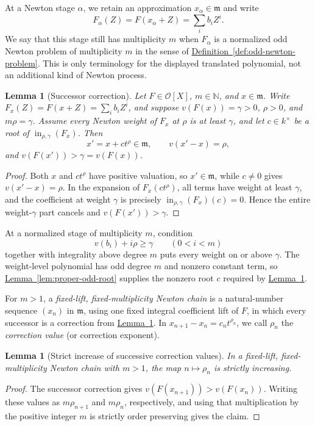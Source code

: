 \documentclass[11pt]{article}
\newcommand{\Val}{v}
\newcommand{\Init}{\operatorname{in}}
\newcommand{\Ocal}{\mathcal O}
\newcommand{\namedref}[2]{\hyperref[#2]{#1~\ref*{#2}}}
\theoremstyle{proofnote}
\newtheorem{lemma}[theorem]{Lemma}
\begin{document}
At a Newton stage \(\alpha\), we retain an approximation
\(x_\alpha\in\mathfrak m\) and write
\[
  F_\alpha(Z)=F(x_\alpha+Z)=\sum_i b_iZ^i.
\]
We say that this stage still has multiplicity \(m\) when \(F_\alpha\) is a
normalized odd Newton problem of multiplicity \(m\) in the sense of
\namedref{Definition}{def:odd-newton-problem}.  This is only terminology for
the displayed translated polynomial, not an additional kind of Newton
process.

\begin{lemma}[Successor correction]
\label{lem:successor-correction}
  Let \(F\in\Ocal[X]\), \(m\in\mathbb N\), and \(x\in\mathfrak m\).  Write
  \(F_x(Z)=F(x+Z)=\sum_i b_iZ^i\), and suppose
  \(\Val(F(x))=\gamma>0\), \(\rho>0\), and \(m\rho=\gamma\).  Assume every
  Newton weight of \(F_x\) at \(\rho\) is at least \(\gamma\), and let
  \(c\in k^\times\) be a root of \(\Init_{\rho,\gamma}(F_x)\).  Then
  \[
    x'=x+c t^\rho\in\mathfrak m,
    \qquad \Val(x'-x)=\rho,
  \]
  and \(\Val(F(x'))>\gamma=\Val(F(x))\).
\end{lemma}
\begin{proof}
  Both \(x\) and \(ct^\rho\) have positive valuation, so
  \(x'\in\mathfrak m\), while \(c\ne0\) gives
  \(\Val(x'-x)=\rho\).  In the expansion of \(F_x(ct^\rho)\), all terms
  have weight at least \(\gamma\), and the coefficient at weight
  \(\gamma\) is precisely \(\Init_{\rho,\gamma}(F_x)(c)=0\).  Hence the
  entire weight-\(\gamma\) part cancels and
  \(\Val(F(x'))>\gamma\).
\end{proof}

At a normalized stage of multiplicity \(m\), condition
\[
  \Val(b_i)+i\rho\ge\gamma\qquad(0<i<m)
  \tag{NB}\label{eq:successor-nonbelow}
\]
together with integrality above degree \(m\) puts every weight on or above
\(\gamma\).  The weight-level polynomial has odd degree \(m\) and nonzero
constant term, so \namedref{Lemma}{lem:proper-odd-root} supplies the nonzero
root \(c\) required by \namedref{Lemma}{lem:successor-correction}.

For \(m>1\), a \emph{fixed-lift, fixed-multiplicity Newton chain} is a
natural-number sequence \((x_n)\) in \(\mathfrak m\), using one fixed
integral coefficient lift of \(F\), in which every successor is a correction
from \namedref{Lemma}{lem:successor-correction}.  In
\(x_{n+1}-x_n=c_nt^{\rho_n}\), we call \(\rho_n\) the
\emph{correction value} (or correction exponent).

\begin{lemma}[Strict increase of successive correction values]
\label{lem:successor-values-strict}
  In a fixed-lift, fixed-multiplicity Newton chain with \(m>1\), the map
  \(n\mapsto\rho_n\) is strictly increasing.
\end{lemma}
\begin{proof}
  The successor correction gives
  \(\Val(F(x_{n+1}))>\Val(F(x_n))\).  Writing these values as
  \(m\rho_{n+1}\) and \(m\rho_n\), respectively, and using that
  multiplication by the positive integer \(m\) is strictly order preserving
  gives the claim.
\end{proof}
\end{document}
